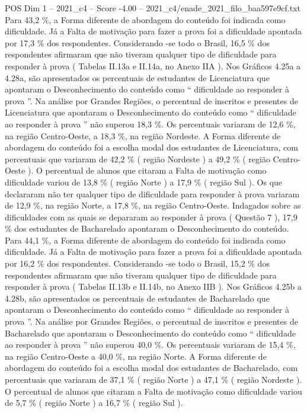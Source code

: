 \begin{textsample}{POS Dim 1 – 2021\_c4 – Score -4.00 – 2021\_c4/enade\_2021\_filo\_baa597e9cf.txt}
Para 43,2 \%, a Forma diferente de abordagem do conteúdo foi indicada como dificuldade.
Já a Falta de motivação para fazer a prova foi a dificuldade apontada por 17,3 \% dos respondentes.
Considerando -se todo o Brasil, 16,5 \% dos respondentes afirmaram que não tiveram qualquer tipo de dificuldade para responder à prova ( Tabelas II.13a e II.14a, no Anexo IIA ).
Nos Gráficos 4.25a a 4.28a, são apresentados os percentuais de estudantes de Licenciatura que apontaram o Desconhecimento do conteúdo como “ dificuldade ao responder à prova ”.
Na análise por Grandes Regiões, o percentual de inscritos e presentes de Licenciatura que apontaram o Desconhecimento do conteúdo como “ dificuldade ao responder à prova ” não superou 18,3 \%.
Os percentuais variaram de 12,6 \%, na região Centro-Oeste, a 18,3 \%, na região Nordeste.
A Forma diferente de abordagem do conteúdo foi a escolha modal dos estudantes de Licenciatura, com percentuais que variaram de 42,2 \% ( região Nordeste ) a 49,2 \% ( região Centro-Oeste ).
O percentual de alunos que citaram a Falta de motivação como dificuldade variou de 13,8 \% ( região Norte ) a 17,9 \% ( região Sul ).
Os que declararam não ter qualquer tipo de dificuldade para responder à prova variaram de 12,9 \%, na região Norte, a 17,8 \%, na região Centro-Oeste.
Indagados sobre as dificuldades com as quais se depararam ao responder à prova ( Questão 7 ), 17,9 \% dos estudantes de Bacharelado apontaram o Desconhecimento do conteúdo.
Para 44,1 \%, a Forma diferente de abordagem do conteúdo foi indicada como dificuldade.
Já a Falta de motivação para fazer a prova foi a dificuldade apontada por 16,2 \% dos respondentes.
Considerando -se todo o Brasil, 15,2 \% dos respondentes afirmaram que não tiveram qualquer tipo de dificuldade para responder à prova ( Tabelas II.13b e II.14b, no Anexo IIB ).
Nos Gráficos 4.25b a 4.28b, são apresentados os percentuais de estudantes de Bacharelado que apontaram o Desconhecimento do conteúdo como “ dificuldade ao responder à prova ”.
Na análise por Grandes Regiões, o percentual de inscritos e presentes de Bacharelado que apontaram o Desconhecimento do conteúdo como “ dificuldade ao responder à prova ” não superou 40,0 \%.
Os percentuais variaram de 15,4 \%, na região Centro-Oeste a 40,0 \%, na região Norte.
A Forma diferente de abordagem do conteúdo foi a escolha modal dos estudantes de Bacharelado, com percentuais que variaram de 37,1 \% ( região Norte ) a 47,1 \% ( região Nordeste ).
O percentual de alunos que citaram a Falta de motivação como dificuldade variou de 5,7 \% ( região Norte ) a 16,7 \% ( região Sul ).

\end{textsample}
